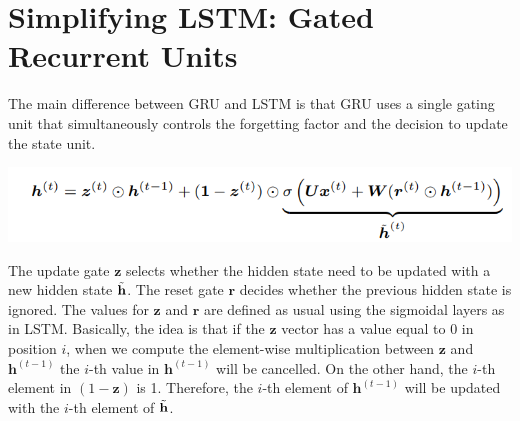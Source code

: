 \section{Simplifying LSTM: Gated Recurrent Units}
The main difference between GRU and LSTM is that GRU uses a single gating unit that simultaneously controls the forgetting factor and the decision to update the state unit.
\begin{center}
    \includegraphics[]{images/GRU.png}
\end{center}
The update gate $\textbf{z}$ selects whether the hidden state need to be updated with a new hidden state $\Tilde{\textbf{h}}$. The reset gate $\textbf{r}$ decides whether the previous hidden state is ignored.\newline\newline
The values for $\textbf{z}$ and $\textbf{r}$ are defined as usual using the sigmoidal layers as in LSTM.\newline\newline
Basically, the idea is that if the $\textbf{z}$ vector has a value equal to 0 in position $i$, when we compute the element-wise multiplication between $\textbf{z}$ and $\textbf{h}^{(t-1)}$ the $i$-th value in $\textbf{h}^{(t-1)}$ will be cancelled. On the other hand, the $i$-th element in $(1 - \textbf{z})$ is 1. Therefore, the $i$-th element of $\textbf{h}^{(t-1)}$ will be updated with the $i$-th element of $\Tilde{\textbf{h}}$.

